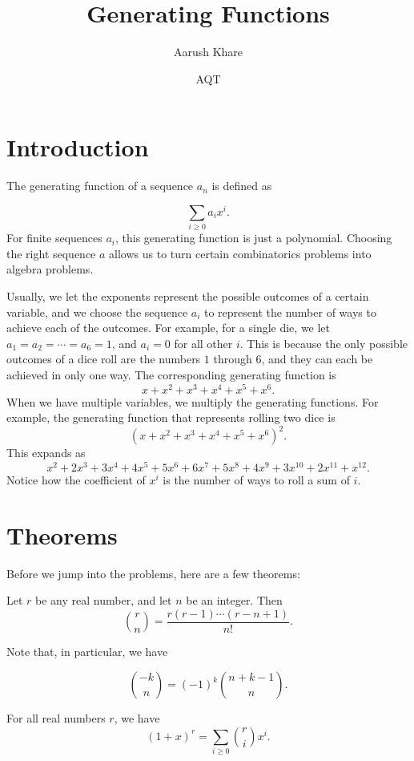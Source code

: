 \documentclass{article}
\title{Generating Functions}
\author{Aarush Khare}
\date{AQT}
\begin{document}
\maketitle

\section{Introduction}

The generating function of a sequence $a_n$ is defined as

\[\sum_{i\ge 0} a_ix^i.\]
For finite sequences $a_i$, this generating function is just a polynomial. Choosing the right sequence $a$ allows us to turn certain combinatorics problems into algebra problems. 

Usually, we let the exponents represent the possible outcomes of a certain variable, and we choose the sequence $a_i$ to represent the number of ways to achieve each of the outcomes. For example, for a single die, we let $a_1 = a_2 = \cdots = a_6 = 1$, and $a_i = 0$ for all other $i$. This is because the only possible outcomes of a dice roll are the numbers $1$ through $6$, and they can each be achieved in only one way. The corresponding generating function is
\[x + x^2 + x^3 + x^4 + x^5 + x^6.\]
When we have multiple variables, we multiply the generating functions. For example, the generating function that represents rolling two dice is
\[(x + x^2 + x^3 + x^4 + x^5 + x^6)^{2}.\]
This expands as
\[x^2 + 2x^3 + 3x^4 + 4x^5 + 5x^6 + 6x^7 + 5x^8 + 4x^9 + 3x^{10} + 2x^{11} + x^{12}.\]
Notice how the coefficient of $x^i$ is the number of ways to roll a sum of $i$.

\section{Theorems}

Before we jump into the problems, here are a few theorems:

\begin{defi}
Let $r$ be any real number, and let $n$ be an integer. Then
\[\binom{r}{n} = \frac{r(r-1)\cdots (r-n+1)}{n!}.\]

\end{defi}

Note that, in particular, we have

\[\binom{-k}{n} = (-1)^k\binom{n+k-1}{n}.\]

\begin{theo}
For all real numbers $r$, we have
\[(1+x)^r = \sum_{i \ge 0}\binom{r}{i}x^i.\]
\end{theo}
\end{document}
